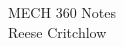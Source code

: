 \documentclass{article}
\begin{document}
\begin{center}
    \Large MECH 360 Notes\\
    \normalsize Reese Critchlow
\end{center}
\end{document}
